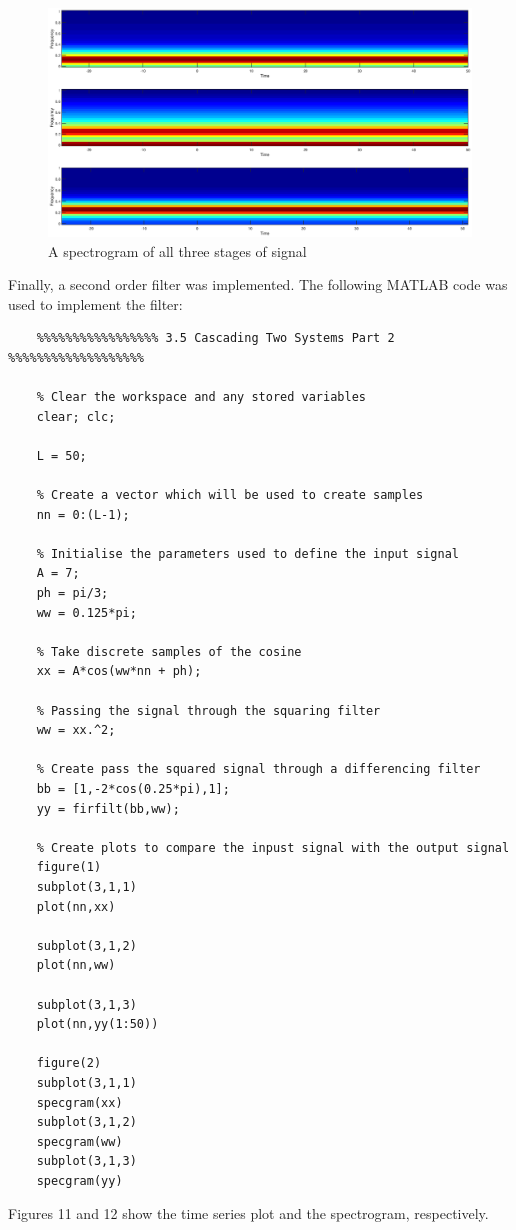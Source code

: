 \documentclass{article}
\begin{document}
\begin{figure}[H]
	\centering
	\includegraphics[scale=0.25]{fig10}
	\caption{A spectrogram of all three stages of signal}
\end{figure}

Finally, a second order filter was implemented. The following MATLAB code was used to implement the filter:
\begin{lstlisting}
	%%%%%%%%%%%%%%%%% 3.5 Cascading Two Systems Part 2 %%%%%%%%%%%%%%%%%%%
	
	% Clear the workspace and any stored variables
	clear; clc;
	
	L = 50;
	
	% Create a vector which will be used to create samples
	nn = 0:(L-1);
	
	% Initialise the parameters used to define the input signal
	A = 7;
	ph = pi/3;
	ww = 0.125*pi;
	
	% Take discrete samples of the cosine
	xx = A*cos(ww*nn + ph);
	
	% Passing the signal through the squaring filter
	ww = xx.^2;
	
	% Create pass the squared signal through a differencing filter
	bb = [1,-2*cos(0.25*pi),1];
	yy = firfilt(bb,ww);
	
	% Create plots to compare the inpust signal with the output signal
	figure(1)
	subplot(3,1,1)
	plot(nn,xx)
	
	subplot(3,1,2)
	plot(nn,ww)
	
	subplot(3,1,3)
	plot(nn,yy(1:50))
	
	figure(2)
	subplot(3,1,1)
	specgram(xx)
	subplot(3,1,2)
	specgram(ww)
	subplot(3,1,3)
	specgram(yy)
\end{lstlisting}

Figures 11 and 12 show the time series plot and the spectrogram, respectively.
\end{document}
